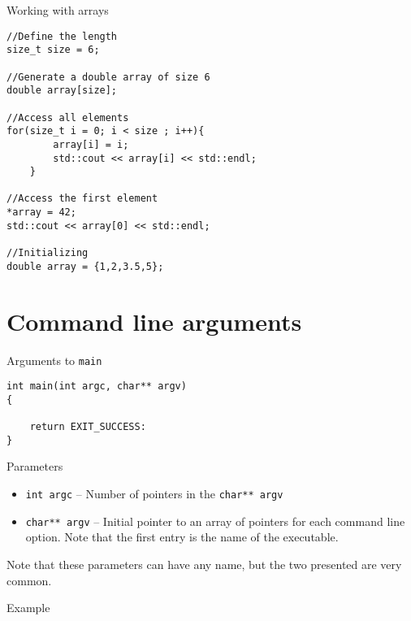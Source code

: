 \documentclass[\classoption]{beamer}
\begin{document}
\begin{frame}[fragile]{Working with arrays}

\begin{lstlisting}
//Define the length
size_t size = 6;

//Generate a double array of size 6
double array[size];

//Access all elements
for(size_t i = 0; i < size ; i++){
        array[i] = i;
        std::cout << array[i] << std::endl;
    }

//Access the first element
*array = 42;
std::cout << array[0] << std::endl;

//Initializing 
double array = {1,2,3.5,5};
\end{lstlisting}

\end{frame}



\section{Command line arguments}

\begin{frame}[fragile]{Arguments to \lstinline|main|}

\begin{lstlisting}
int main(int argc, char** argv)
{

	return EXIT_SUCCESS:
}
\end{lstlisting}

\begin{block}{Parameters}
\begin{itemize}
\item \lstinline|int argc| -- Number of pointers in the \lstinline|char** argv|
\item \lstinline|char** argv| -- Initial pointer to an array of pointers for each command line option. Note that the first entry is the name of the executable.
\end{itemize}
\end{block}
Note that these parameters can have any name, but the two presented are very common.
\end{frame}


\begin{frame}[fragile]{Example}



\end{frame}
\end{document}
